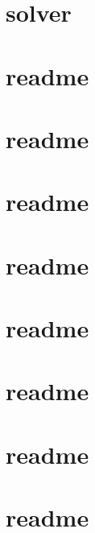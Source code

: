 \documentclass[twoside]{book}
\newcommand{\+}{\discretionary{\mbox{\scriptsize$\hookleftarrow$}}{}{}}
\begin{document}
\chapter{solver}
\label{md_docs_tutorial_solver}

\chapter{readme}
\label{md_examples_cifar10_readme}

\chapter{readme}
\label{md_examples_cpp_classification_readme}

\chapter{readme}
\label{md_examples_feature_extraction_readme}

\chapter{readme}
\label{md_examples_finetune_flickr_style_readme}

\chapter{readme}
\label{md_examples_imagenet_readme}

\chapter{readme}
\label{md_examples_mnist_readme}

\chapter{readme}
\label{md_examples_siamese_readme}

\chapter{readme}
\label{md_examples_web_demo_readme}

\end{document}
